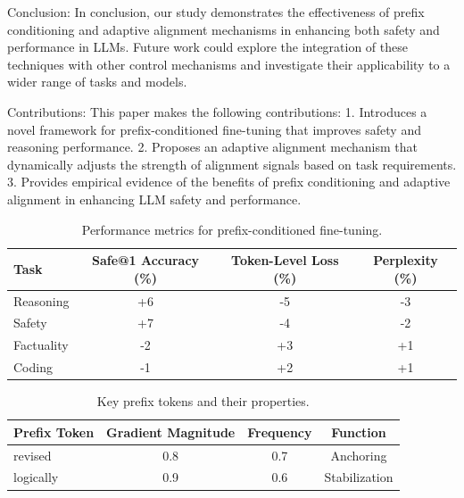 Conclusion:
In conclusion, our study demonstrates the effectiveness of prefix conditioning and adaptive alignment mechanisms in enhancing both safety and performance in LLMs. Future work could explore the integration of these techniques with other control mechanisms and investigate their applicability to a wider range of tasks and models.

Contributions:
This paper makes the following contributions:
1. Introduces a novel framework for prefix-conditioned fine-tuning that improves safety and reasoning performance.
2. Proposes an adaptive alignment mechanism that dynamically adjusts the strength of alignment signals based on task requirements.
3. Provides empirical evidence of the benefits of prefix conditioning and adaptive alignment in enhancing LLM safety and performance.

\begin{table}[h]
\centering
\begin{tabular}{|l|c|c|c|}
\hline
\textbf{Task} & \textbf{Safe@1 Accuracy (\%)} & \textbf{Token-Level Loss (\%)} & \textbf{Perplexity (\%)} \\
\hline
Reasoning & +6 & -5 & -3 \\
Safety & +7 & -4 & -2 \\
Factuality & -2 & +3 & +1 \\
Coding & -1 & +2 & +1 \\
\hline
\end{tabular}
\caption{Performance metrics for prefix-conditioned fine-tuning.}
\label{tab:performance_metrics}
\end{table}

\begin{table}[h]
\centering
\begin{tabular}{|l|c|c|c|}
\hline
\textbf{Prefix Token} & \textbf{Gradient Magnitude} & \textbf{Frequency} & \textbf{Function} \\
\hline
revised & 0.8 & 0.7 & Anchoring \\
logically & 0.9 & 0.6 & Stabilization \\
\hline
\end{tabular}
\caption{Key prefix tokens and their properties.}
\label{tab:prefix_tokens}
\end{table}